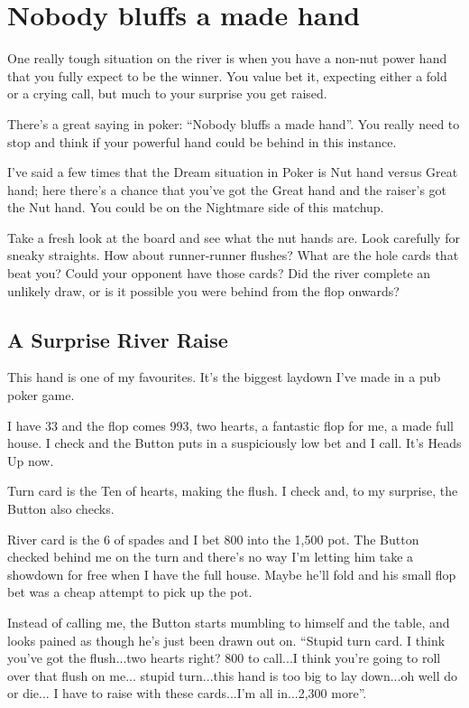 \chapter{Nobody bluffs a made hand}


One really tough situation on the river is when you have a
non-nut power hand that you fully expect to be the winner.
You value bet it, expecting either a fold or a crying call,
but much to your surprise you get raised.

There's a great saying in poker: ``Nobody bluffs a made hand''.
You really need to stop and think if your powerful hand could
be behind in this instance.

I've said a few times that the Dream situation in
Poker is Nut hand versus Great hand; here there's a chance
that you've got the Great hand and the raiser's got the Nut hand.
You could be on the Nightmare side of this matchup.

Take a fresh look at the board and see what the nut hands are.
Look carefully for sneaky straights. How about runner-runner flushes?
What are the hole cards that beat you? Could your opponent
have those cards? Did the river complete an unlikely draw, or is it
possible you were behind from the flop onwards?

\section{A Surprise River Raise}

This hand is one of my favourites. It's the biggest
laydown I've made in a pub poker game.

I have 33 and the flop comes 993, two hearts, a fantastic
flop for me, a made full house. I check and the Button puts in a
suspiciously low bet and I call. It's Heads Up now.

Turn card is the Ten of hearts, making the flush. I check and, to my
surprise, the Button also checks.

River card is the 6 of spades and I bet 800 into the 1,500 pot. The Button
checked behind me on the turn and there's no way I'm letting him
take a showdown for free when I have the full house. Maybe he'll fold
and his small flop bet was a cheap attempt to pick up the pot.

Instead of calling me, the Button starts mumbling to himself and the
table, and looks pained as though he's just been drawn out on.
``Stupid turn card. I think you've got the flush...two hearts right?
800 to call...I think you're going to roll over that flush on me...
stupid turn...this hand is too big to lay down...oh well do or die...
I have to raise with these cards...I'm all in...2,300 more''.

